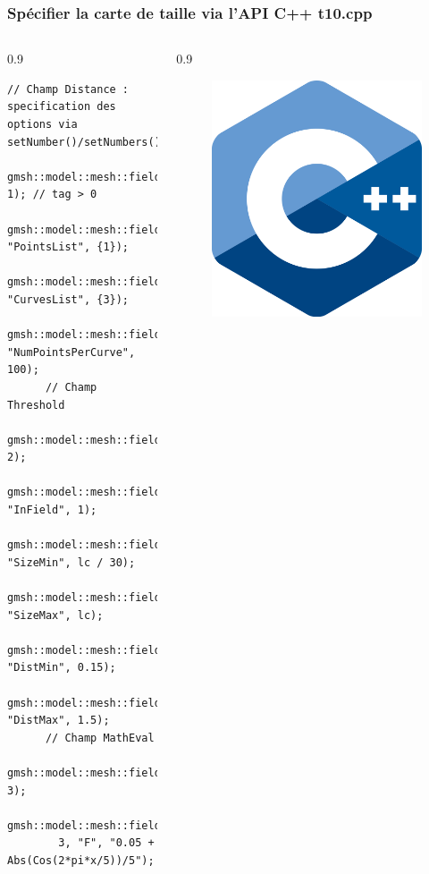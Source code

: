 \documentclass[aspectratio=169]{beamer}
\begin{document}
\begin{frame}[fragile]
\frametitle{Spécifier la carte de taille via l'API C++ \hfill t10.cpp}
  \footnotesize
  \begin{columns}
    \begin{column}{0.9\linewidth}
    \begin{lstlisting}[frame=none, aboveskip=0mm]
      // Champ Distance : specification des options via setNumber()/setNumbers()
      gmsh::model::mesh::field::add("Distance", 1); // tag > 0
      gmsh::model::mesh::field::setNumbers(1, "PointsList", {1});
      gmsh::model::mesh::field::setNumbers(1, "CurvesList", {3});
      gmsh::model::mesh::field::setNumber(1, "NumPointsPerCurve", 100);
      // Champ Threshold
      gmsh::model::mesh::field::add("Threshold", 2);
      gmsh::model::mesh::field::setNumber(2, "InField", 1);
      gmsh::model::mesh::field::setNumber(2, "SizeMin", lc / 30);
      gmsh::model::mesh::field::setNumber(2, "SizeMax", lc);
      gmsh::model::mesh::field::setNumber(2, "DistMin", 0.15);
      gmsh::model::mesh::field::setNumber(2, "DistMax", 1.5);
      // Champ MathEval
      gmsh::model::mesh::field::add("MathEval", 3);
      gmsh::model::mesh::field::setString(
        3, "F", "0.05 + Abs(Cos(2*pi*x/5))/5");
    \end{lstlisting}
    \end{column}
    \begin{column}{0.9\linewidth}
      \begin{figure}
        \vspace{-5.5cm}
        \hspace{-8cm}
        \includegraphics[width=0.1\linewidth]{figures/cpp.png}
        \caption{}
        \label{}
      \end{figure}
    \end{column}
  \end{columns}
\end{frame}
\end{document}
